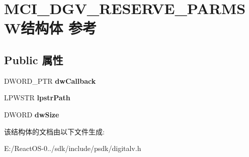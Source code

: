 \hypertarget{struct_m_c_i___d_g_v___r_e_s_e_r_v_e___p_a_r_m_s_w}{}\section{M\+C\+I\+\_\+\+D\+G\+V\+\_\+\+R\+E\+S\+E\+R\+V\+E\+\_\+\+P\+A\+R\+M\+S\+W结构体 参考}
\label{struct_m_c_i___d_g_v___r_e_s_e_r_v_e___p_a_r_m_s_w}
\subsection*{Public 属性}
\begin{DoxyCompactItemize}
\item 
\mbox{\label{struct_m_c_i___d_g_v___r_e_s_e_r_v_e___p_a_r_m_s_w_aec60824af43e9b2266940286da50fd68}} 
D\+W\+O\+R\+D\+\_\+\+P\+TR {\bfseries dw\+Callback}
\item 
\mbox{\label{struct_m_c_i___d_g_v___r_e_s_e_r_v_e___p_a_r_m_s_w_a88b58ec10de25700a4724d5537bf649d}} 
L\+P\+W\+S\+TR {\bfseries lpstr\+Path}
\item 
\mbox{\label{struct_m_c_i___d_g_v___r_e_s_e_r_v_e___p_a_r_m_s_w_ab0cecfd28d59be53b8e153caa86d10a6}} 
D\+W\+O\+RD {\bfseries dw\+Size}
\end{DoxyCompactItemize}


该结构体的文档由以下文件生成\+:\begin{DoxyCompactItemize}
\item 
E\+:/\+React\+O\+S-\/0../sdk/include/psdk/digitalv.\+h\end{DoxyCompactItemize}
